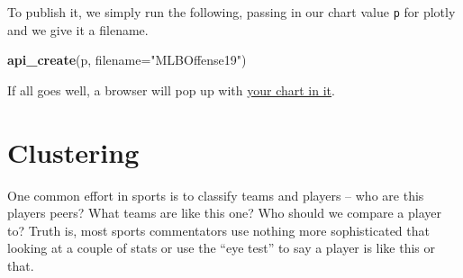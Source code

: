 \documentclass[
]{book}
\newenvironment{Shaded}{\begin{snugshade}}{\end{snugshade}}
\newcommand{\DataTypeTok}[1]{\textcolor[rgb]{0.13,0.29,0.53}{#1}}
\newcommand{\KeywordTok}[1]{\textcolor[rgb]{0.13,0.29,0.53}{\textbf{#1}}}
\newcommand{\NormalTok}[1]{#1}
\newcommand{\OperatorTok}[1]{\textcolor[rgb]{0.81,0.36,0.00}{\textbf{#1}}}
\newcommand{\StringTok}[1]{\textcolor[rgb]{0.31,0.60,0.02}{#1}}
\begin{document}
\begin{Shaded}
\end{Shaded}

To publish it, we simply run the following, passing in our chart value \texttt{p} for plotly and we give it a filename.

\begin{Shaded}
\begin{Highlighting}[]
\KeywordTok{api_create}\NormalTok{(p, }\DataTypeTok{filename=}\StringTok{"MLBOffense19"}\NormalTok{)}
\end{Highlighting}
\end{Shaded}

If all goes well, a browser will pop up with \href{https://plot.ly/~mattwaite/1/\#/}{your chart in it}.

\hypertarget{clustering}{%
\chapter{Clustering}\label{clustering}}

One common effort in sports is to classify teams and players -- who are this players peers? What teams are like this one? Who should we compare a player to? Truth is, most sports commentators use nothing more sophisticated that looking at a couple of stats or use the ``eye test'' to say a player is like this or that.
\end{document}
